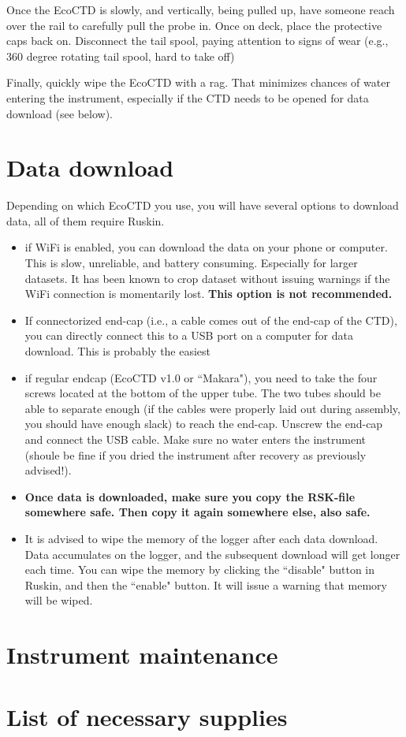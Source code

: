 \documentclass[13pt]{article}
\begin{document}
Once the EcoCTD is slowly, and vertically, being pulled up, have someone reach over the rail to carefully pull the probe in. Once on deck, place the protective caps back on. Disconnect the tail spool, paying attention to signs of wear (e.g., 360 degree rotating tail spool, hard to take off)

Finally, quickly wipe the EcoCTD with a rag. That minimizes chances of water entering the instrument, especially if the CTD needs to be opened for data download (see below).

\section{Data download}
Depending on which EcoCTD you use, you will have several options to download data, all of them require Ruskin.
\begin{itemize}
    \item if WiFi is enabled, you can download the data on your phone or computer. This is slow, unreliable, and battery consuming. Especially for larger datasets. It has been known to crop dataset without issuing warnings if the WiFi connection is momentarily lost. \textbf{This option is not recommended.}
    \item If connectorized end-cap (i.e., a cable comes out of the end-cap of the CTD), you can directly connect this to a USB port on a computer for data download. This is probably the easiest
    \item if regular endcap (EcoCTD v1.0 or ``Makara"), you need to take the four screws located at the bottom of the upper tube. The two tubes should be able to separate enough (if the cables were properly laid out during assembly, you should have enough slack) to reach the end-cap. Unscrew the end-cap and connect the USB cable. Make sure no water enters the instrument (shoule be fine if you dried the instrument after recovery as previously advised!).
    \item \textbf{Once data is downloaded, make sure you copy the RSK-file somewhere safe. Then copy it again somewhere else, also safe.}
    \item It is advised to wipe the memory of the logger after each data download. Data accumulates on the logger, and the subsequent download will get longer each time. You can wipe the memory by clicking the ``disable" button in Ruskin, and then the ``enable" button. It will issue a warning that memory will be wiped.
\end{itemize}

\section{Instrument maintenance}

\section{List of necessary supplies}
\end{document}
